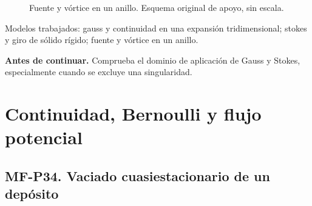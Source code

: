 \begin{figure}[htbp]\centering{}\caption{Fuente y vórtice en un anillo. Esquema original de apoyo, sin escala.}\label{fig:mf-p33}\end{figure}


\begin{tcolorbox}[studiumcheck,breakable=false,title={Síntesis y comprobación}]Modelos trabajados: gauss y continuidad en una expansión tridimensional; stokes y giro de sólido rígido; fuente y vórtice en un anillo.\par\textbf{Antes de continuar.} Comprueba el dominio de aplicación de Gauss y Stokes, especialmente cuando se excluye una singularidad.\end{tcolorbox}

\chapter{Continuidad, Bernoulli y flujo potencial}


\Needspace{.30\textheight}\section{MF-P34. Vaciado cuasiestacionario de un depósito}

